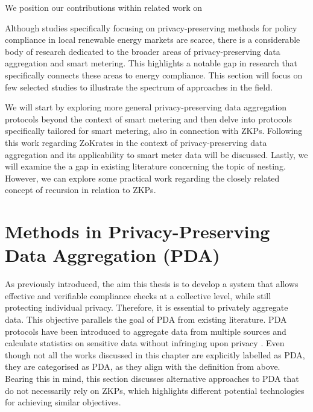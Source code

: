 We position our contributions within related work on 


Although studies specifically focusing on privacy-preserving methods for policy compliance in local renewable energy markets are scarce, there is a considerable body of research dedicated to the broader areas of privacy-preserving data aggregation and smart metering. This highlights a notable gap in research that specifically connects these areas to energy compliance. This section will focus on few selected studies to illustrate the spectrum of approaches in the field.

We will start by exploring more general privacy-preserving data aggregation protocols beyond the context of smart metering and then delve into protocols specifically tailored for smart metering, also in connection with ZKPs. Following this work regarding ZoKrates in the context of privacy-preserving data aggregation and its applicability to smart meter data will be discussed. Lastly, we will examine the a gap in existing literature concerning the topic of nesting. However, we can explore some practical work regarding the closely related concept of recursion in relation to ZKPs.

\section{Methods in Privacy-Preserving Data Aggregation (PDA)}

As previously introduced, the aim this thesis is to develop a system that allows effective and verifiable compliance checks at a collective level, while still protecting individual privacy. Therefore, it is essential to privately aggregate data. This objective parallels the goal of PDA from existing literature. PDA protocols have been introduced to aggregate data from multiple sources and calculate statistics on sensitive data without infringing upon privacy \cite{PDA}. Even though not all the works discussed in this chapter are explicitly labelled as PDA, they are categorised as PDA, as they align with the definition from above. Bearing this in mind, this section discusses alternative approaches to PDA that do not necessarily rely on ZKPs, which highlights different potential  technologies for achieving similar objectives.


